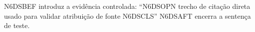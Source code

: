 \documentclass{abntexto-ufc}
\begin{document}
\textual

\noindent N6DSBEF introduz a evidência controlada: \enquote{N6DSOPN trecho de citação direta usado para validar atribuição de fonte N6DSCLS} \cite[103]{oliveira2011} N6DSAFT encerra a sentença de teste.
\end{document}
